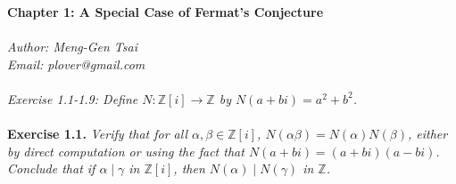 \documentclass{article}
\begin{document}
\textbf{\Large Chapter 1: A Special Case of Fermat's Conjecture} \\\\



\emph{Author: Meng-Gen Tsai} \\
\emph{Email: plover@gmail.com} \\\\









\emph{Exercise 1.1-1.9: Define $N: \mathbb{Z}[i] \rightarrow \mathbb{Z}$ by
$N(a+bi) = a^2 + b^2$.} \\\\



\textbf{Exercise 1.1.}
\emph{Verify that for all $\alpha, \beta \in \mathbb{Z}[i]$,
$N(\alpha\beta) = N(\alpha)N(\beta)$,
either by direct computation or using the fact that
$N(a+bi) = (a+bi)(a-bi)$.
Conclude that if $\alpha \mid \gamma$ in $\mathbb{Z}[i]$,
then $N(\alpha) \mid N(\gamma)$ in $\mathbb{Z}$.} \\
\end{document}

